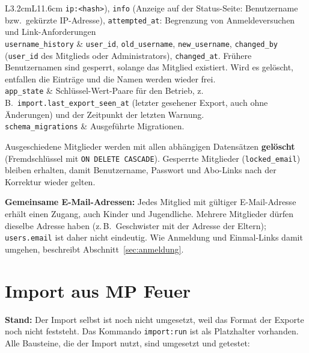 \documentclass[a4paper,fontsize=10pt]{scrartcl}
\newcommand{\code}[1]{\texttt{#1}}
\begin{document}
\begin{longtable}{L{3.2cm}L{11.6cm}}
\code{ip:<hash>}), \code{info} (Anzeige auf der Status-Seite:
Benutzername bzw.\ gekürzte IP-Adresse), \code{attempted\_at}: Begrenzung
von Anmeldeversuchen und Link-Anforderungen \\
\addlinespace
\code{username\_history} &
\code{user\_id}, \code{old\_username}, \code{new\_username},
\code{changed\_by} (\code{user\_id} des Mitglieds oder Administrators),
\code{changed\_at}. Frühere Benutzernamen sind gesperrt, solange das
Mitglied existiert. Wird es gelöscht, entfallen die Einträge und die Namen
werden wieder frei. \\
\addlinespace
\code{app\_state} &
Schlüssel-Wert-Paare für den Betrieb, z.\,B.\
\code{import.last\_export\_seen\_at} (letzter gesehener Export, auch ohne
Änderungen) und der Zeitpunkt der letzten Warnung. \\
\addlinespace
\code{schema\_migrations} &
Ausgeführte Migrationen. \\
\bottomrule
\end{longtable}

Ausgeschiedene Mitglieder werden mit allen abhängigen Datensätzen
\textbf{gelöscht} (Fremdschlüssel mit \code{ON DELETE CASCADE}). Gesperrte
Mitglieder (\code{locked\_email}) bleiben erhalten, damit Benutzername,
Passwort und Abo-Links nach der Korrektur wieder gelten.

\textbf{Gemeinsame E-Mail-Adressen:} Jedes Mitglied mit gültiger
E-Mail-Adresse erhält einen Zugang, auch Kinder und Jugendliche. Mehrere
Mitglieder dürfen dieselbe Adresse haben (z.\,B.\ Geschwister mit der
Adresse der Eltern); \code{users.email} ist daher nicht eindeutig. Wie
Anmeldung und Einmal-Links damit umgehen, beschreibt
Abschnitt~\ref{sec:anmeldung}.

\section{Import aus MP Feuer}\label{sec:import}

\textbf{Stand:} Der Import selbst ist noch nicht umgesetzt, weil das Format
der Exporte noch nicht feststeht. Das Kommando \code{import:run} ist als
Platzhalter vorhanden. Alle Bausteine, die der Import nutzt, sind umgesetzt
und getestet:
\end{document}
